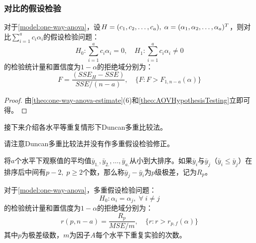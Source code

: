 \subsubsection{对比的假设检验}
\begin{theorem}
	对于\cref{model:one-way-anova}，设$H=(c_1, c_2, \dots, c_{a}),\;\alpha=(\alpha_1, \alpha_2, \dots, \alpha_{a})^T$，则对比$\sum\limits_{i=1}^{a}c_i\alpha_i$的假设检验问题：
	\begin{equation*}
		H_0:\sum_{i=1}^{a}c_i\alpha_i=0,\quad H_1:\sum_{i=1}^{a}c_i\alpha_i\ne0
	\end{equation*}
	的检验统计量和置信度为$1-\alpha$的拒绝域分别为：
	\begin{equation*}
		F=\frac{(SSE_H-SSE)}{SSE/(n-a)},\quad\{F:F>F_{1,n-a}(\alpha)\}
	\end{equation*}
\end{theorem}
\begin{proof}
	由\cref{theo:one-way-anova-estimate}(6)和\cref{theo:AOVHypothesisTesting}立即可得。
\end{proof}
接下来介绍各水平等重复情形下Duncan多重比较法。
\begin{note}
	请注意Duncan多重比较法并没有作多重假设检验修正。
\end{note}
\begin{definition}
	将$a$个水平下观察值的平均值$\bar{y}_{1.},\bar{y}_{2.},\dots,\bar{y}_{a.}$从小到大排序。如果$\bar{y}_i$与$\bar{y}_j$（$\bar{y}_i\leqslant\bar{y}_j$）在排序后中间有$p-2,\;p\geqslant2$个数，那么称$\bar{y}_j-\bar{y}_i$为$p$级极差，记为$R_p$。
\end{definition}
\begin{theorem}
	对于\cref{model:one-way-anova}，多重假设检验问题：
	\begin{equation*}
	H_0:\alpha_i=\alpha_j,\;\forall\;i\ne j
	\end{equation*}
	的检验统计量和置信度为$1-\alpha$的拒绝域分别为：
	\begin{equation*}
		r(p,n-a)=\frac{R_p}{MSE/m},\quad\{r:r>r_{p,f}(\alpha)\}
	\end{equation*}
	其中$p$为极差级数，$m$为因子$A$每个水平下重复实验的次数。
\end{theorem}

